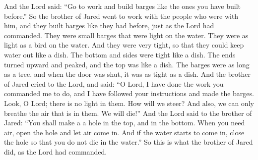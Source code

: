 And the Lord said: ``Go to work and build barges like the ones you have built before.'' So the brother of Jared went to work with the people who were with him, and they built barges like they had before, just as the Lord had commanded. They were small barges that were light on the water. They were as light as a bird on the water.
\bverse \iffalse And they were built after a manner that they were exceedingly tight, even that they would hold water like unto a dish; and the bottom thereof was tight like unto a dish; and the sides thereof were tight like unto a dish; and the ends thereof were peaked; and the top thereof was tight like unto a dish; and the length thereof was the length of a tree; and the door thereof, when it was shut, was tight like unto a dish. \fi
And they were very tight, so that they could keep water out like a dish. The bottom and sides were tight like a dish. The ends turned upward and peaked, and the top was like a dish. The barges were as long as a tree, and when the door was shut, it was as tight as a dish.
\bverse \iffalse And it came to pass that the brother of Jared cried unto the Lord, saying: O Lord, I have performed the work which thou hast commanded me, and I have made the barges according as thou hast directed me. \fi
And the brother of Jared cried to the Lord, and said: ``O Lord, I have done the work you commanded me to do, and I have followed your instructions and made the barges.
\bverse \iffalse And behold, O Lord, in them there is no light; whither shall we steer? And also we shall perish, for in them we cannot breathe, save it is the air which is in them; therefore we shall perish. \fi
Look, O Lord; there is no light in them. How will we steer? And also, we can only breathe the air that is in them. We will die!''
\bverse \iffalse And the Lord said unto the brother of Jared: Behold, thou shalt make a hole in the top, and also in the bottom; and when thou shalt suffer for air thou shalt unstop the hole and receive air. And if it be so that the water come in upon thee, behold, ye shall stop the hole, that ye may not perish in the flood. \fi
And the Lord said to the brother of Jared: ``You shall make a a hole in the top, and in the bottom. When you need air, open the hole and let air come in. And if the water starts to come in, close the hole so that you do not die in the water.''
\bverse \iffalse And it came to pass that the brother of Jared did so, according as the Lord had commanded. \fi
So this is what the brother of Jared did, as the Lord had commanded.
